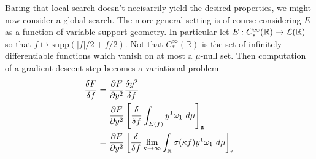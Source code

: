 \documentclass[12pt]{article}
\begin{document}
\begin{itemize}
{	Baring that local search doesn't necisarrily yield the desired properties, we might now consider a global search.
	The more general setting is of course considering $E$ as a function of variable support geometry. In particular let $E: C^{\infty}_*(\mathbb{R}) \to {\mathcal L}(\mathbb{R})$ so that $f \mapsto \text{supp}(|f|/2 + f/2).$ Not that $C^{\infty}_*(\mathbb{R})$ is the set of infinitely differentiable functions which vanish on at most a $\mu$-null set. Then computation of a gradient descent step becomes a variational problem
	\begin{equation*}
		\begin{aligned}
			\frac{\delta F}{\delta f} &= \frac{\partial F}{\partial y^2} \frac{\delta y^2}{\delta f}  \\
			&= \frac{\partial F}{\partial y^2} \left[\frac{\delta}{\delta f} \int_{E(f)} y^1 \omega_1\ d\mu \right]_{\mathfrak{n}} \\
			&= \frac{\partial F}{\partial y^2} \left[\frac{\delta}{\delta f} \lim_{\kappa \to \infty}\int_{{\mathbb R}} {\sigma}(\kappa f) y^1 \omega_1\ d\mu \right]_{\mathfrak{n}}
		\end{aligned}
	\end{equation*}

}
\end{itemize}
\end{document}
